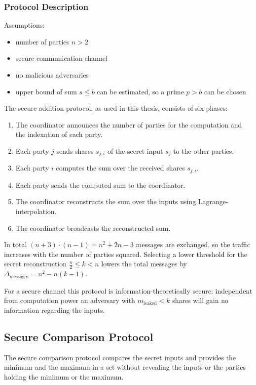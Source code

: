 		\subsubsection*{Protocol Description}
		Assumptions:
		\vspace{-\topsep}
		\begin{itemize}
			\itemsep-0.5em
			\item number of parties $n>2$
			\item secure communication channel
			\item no malicious adversaries
			\item upper bound of sum $s \leq b$ can be estimated, so a prime $p > b$ can be chosen 
		\end{itemize}
		The secure addition protocol, as used in this thesis, consists of six phases:
		\begin{enumerate}
		\itemsep-0.5em
		\item The coordinator announces the number of parties for the computation and the indexation of each party.
		\item Each party $j$ sends shares $s_{j,i}$ of the secret input $s_j$ to the other parties.
		\item Each party $i$ computes the sum over the received shares $s_{j,i}$.
		\item Each party sends the computed sum to the coordinator.
		\item The coordinator reconstructs the sum over the inputs using Lagrange-interpolation.
		\item The coordinator broadcasts the reconstructed sum.
		\end{enumerate}
	
	In total $(n+3)\cdot (n-1)=n^2+2n-3$ messages are exchanged, so the traffic increases with the number of parties squared. Selecting a lower threshold for the secret reconstruction $\frac{n}{2} \leq k<n$ lowers the total messages by $\Delta_{\text{messages}}=n^2-n(k-1)$.
	
	For a secure channel this protocol is information-theoretically secure: independent from computation power an adversary with $m_\text{leaked}<k$ shares will gain no information regarding the inputs. 
	
		
		\subsection{Secure Comparison Protocol}
		\label{Secure Comparison Protocol}
		The secure comparison protocol compares the secret inputs and provides the minimum and the maximum in a set without revealing the inputs or the parties holding the minimum or the maximum.
		
